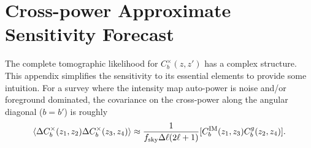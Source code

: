 \documentclass[fleqn,usenatbib]{mnras}
\begin{document}
\onecolumn
\appendix

\section{Cross-power Approximate Sensitivity Forecast}
\label{sec:appendix_sensitivity_forecast}

The complete tomographic likelihood for $C_b^{\times}(z,z')$ has a complex structure. This appendix simplifies the sensitivity to its essential elements to provide some intuition.
For a survey where the intensity map auto-power is noise and/or foreground dominated, the covariance on the cross-power along the angular diagonal ($b=b'$) is roughly
\begin{equation}\label{eq:cross_power_cov_approx_appendix}
    \langle \Delta C_b^{\times}(z_1,z_2) \Delta C_b^{\times}(z_3,z_4) \rangle \approx  \frac{1}{f_{\rm sky} \Delta \ell (2\ell + 1)} [ C_b^{\rm IM}(z_1,z_3) C_b^{g}(z_2,z_4)].
\end{equation}
\end{document}
